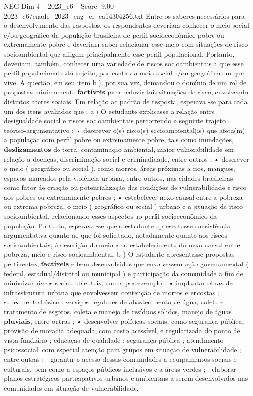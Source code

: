 \begin{textsample}{NEG Dim 4 – 2023\_c6 – Score -9.00 – 2023\_c6/enade\_2023\_eng\_el\_ca14304256.txt}
Entre os saberes necessários para o desenvolvimento das respostas, os respondentes deveriam conhecer o meio social e/ou geográfico da população brasileira de perfil socioeconômico pobre ou extremamente pobre e deveriam saber relacionar esse meio com situações de risco socioambiental que afligem principalmente esse perfil populacional.
Portanto, deveriam, também, conhecer uma variedade de riscos socioambientais a que esse perfil populacional está sujeito, por conta do meio social e/ou geográfico em que vive.
A questão, em seu item b ), por sua vez, demandou o domínio de um rol de propostas minimamente \textbf{factíveis} para reduzir tais situações de risco, envolvendo distintos atores sociais.
Em relação ao padrão de resposta, esperava -se para cada um dos itens avaliados que : a ) O estudante explicasse a relação entre desigualdade social e riscos socioambientais percorrendo o seguinte trajeto teórico-argumentativo : • descrever o(s) risco(s) socioambiental(is) que afeta(m) a população com perfil pobre ou extremamente pobre, tais como inundações, \textbf{deslizamentos} de terra, contaminação ambiental, maior vulnerabilidade em relação a doenças, discriminação social e criminalidade, entre outros ; • descrever o meio ( geográfico ou social ), como morros, áreas próximas a rios, mangues, espaços marcados pela violência urbana, entre outros, nas cidades brasileiras, como fator de criação ou potencialização das condições de vulnerabilidade e risco aos pobres ou extremamente pobres ; • estabelecer nexo causal entre a pobreza ou extrema pobreza, o meio ( geográfico ou social ) urbano e a situação de risco socioambiental, relacionando esses aspectos ao perfil socioeconômico da população.
Portanto, esperava -se que o estudante apresentasse consistência argumentativa quanto ao que foi solicitado, notadamente quanto aos riscos socioambientais, à descrição do meio e ao estabelecimento do nexo causal entre pobreza, meio e risco socioambiental. b ) O estudante apresentasse propostas pertinentes, \textbf{factíveis} e bem desenvolvidas que envolvessem ação governamental ( federal, estadual/distrital ou municipal ) e participação da comunidade a fim de minimizar riscos socioambientais, como, por exemplo : • implantar obras de infraestrutura urbana que envolvessem contenção de morros e encostas ; saneamento básico : serviços regulares de abastecimento de água, coleta e tratamento de esgotos, coleta e manejo de resíduos sólidos, manejo de águas \textbf{pluviais}, entre outras ; • desenvolver políticas sociais, como segurança pública, provisão de moradia adequada, com custo acessível, e regularizada do ponto de vista fundiário ; educação de qualidade ; segurança pública ; atendimento psicossocial, com especial atenção para grupos em situação de vulnerabilidade ; entre outras ;  garantir o acesso dessas comunidades a equipamentos sociais e culturais, bem como a espaços públicos inclusivos e a áreas verdes ;  elaborar planos estratégicos participativos urbanos e ambientais a serem desenvolvidos nas comunidades em situação de vulnerabilidade.

\end{textsample}
